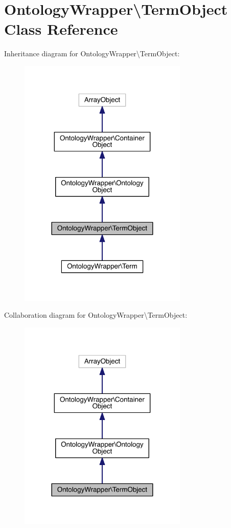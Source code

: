 \hypertarget{class_ontology_wrapper_1_1_term_object}{\section{Ontology\-Wrapper\textbackslash{}Term\-Object Class Reference}
\label{class_ontology_wrapper_1_1_term_object}
}


Inheritance diagram for Ontology\-Wrapper\textbackslash{}Term\-Object\-:
\nopagebreak
\begin{figure}[H]
\begin{center}
\leavevmode
\includegraphics[width=228pt]{class_ontology_wrapper_1_1_term_object__inherit__graph}
\end{center}
\end{figure}


Collaboration diagram for Ontology\-Wrapper\textbackslash{}Term\-Object\-:
\nopagebreak
\begin{figure}[H]
\begin{center}
\leavevmode
\includegraphics[width=228pt]{class_ontology_wrapper_1_1_term_object__coll__graph}
\end{center}
\end{figure}

